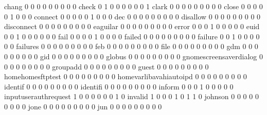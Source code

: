 \documentclass[compress,8pt]{beamer}
\begin{document}
\begin{frame}
\begin{Schunk}
  chang                                      0   0   0   0   0   0   0   0   0
  check                                      0   1   0   0   0   0   0   0   1
  clark                                      0   0   0   0   0   0   0   0   0
  close                                      0   0   0   0   0   1   0   0   0
  connect                                    0   0   0   0   0   1   0   0   0
  dec                                        0   0   0   0   0   0   0   0   0
  disallow                                   0   0   0   0   0   0   0   0   0
  disconnect                                 0   0   0   0   0   0   0   0   0
  eaguilar                                   0   0   0   0   0   0   0   0   0
  error                                      0   0   0   1   0   0   0   0   0
  euid                                       0   0   1   0   0   0   0   0   0
  fail                                       0   0   0   0   1   0   0   0   0
  failed                                     0   0   0   0   0   0   0   0   0
  failure                                    0   0   1   0   0   0   0   0   0
  failures                                   0   0   0   0   0   0   0   0   0
  feb                                        0   0   0   0   0   0   0   0   0
  file                                       0   0   0   0   0   0   0   0   0
  gdm                                        0   0   0   0   0   0   0   0   0
  gid                                        0   0   0   0   0   0   0   0   0
  globus                                     0   0   0   0   0   0   0   0   0
  gnomescreensaverdialog                     0   0   0   0   0   0   0   0   0
  groupadd                                   0   0   0   0   0   0   0   0   0
  guest                                      0   0   0   0   0   0   0   0   0
  homehomesftptest                           0   0   0   0   0   0   0   0   0
  homevarlibavahiautoipd                     0   0   0   0   0   0   0   0   0
  identif                                    0   0   0   0   0   0   0   0   0
  identifi                                   0   0   0   0   0   0   0   0   0
  inform                                     0   0   0   1   0   0   0   0   0
  inputuserauthrequest                       1   0   0   0   0   0   0   1   0
  invalid                                    1   0   0   0   1   0   1   1   0
  johnson                                    0   0   0   0   0   0   0   0   0
  jone                                       0   0   0   0   0   0   0   0   0
  jun                                        0   0   0   0   0   0   0   0   0

\end{Schunk}
\end{frame}
\end{document}
